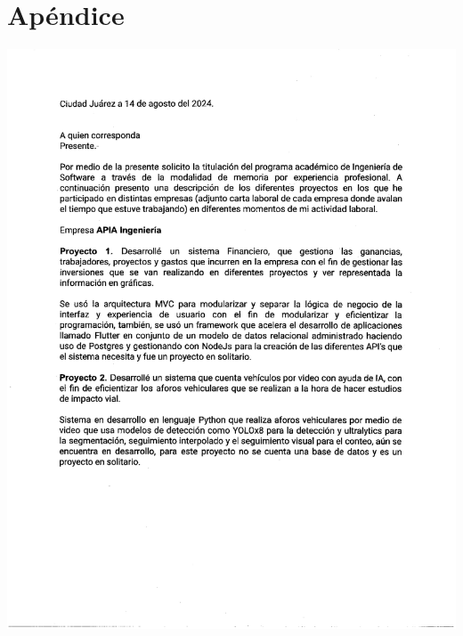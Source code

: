 \documentclass[final, fmstyle, 12pt]{article}
\begin{document}
\newpage 


\newpage 


\newpage 





\listoffigures
\section{Apéndice}
\begin{center}
    
\includegraphics[scale=0.8]{Imagenes/Pdf/Carta1.pdf}


\end{center}
\end{document}
